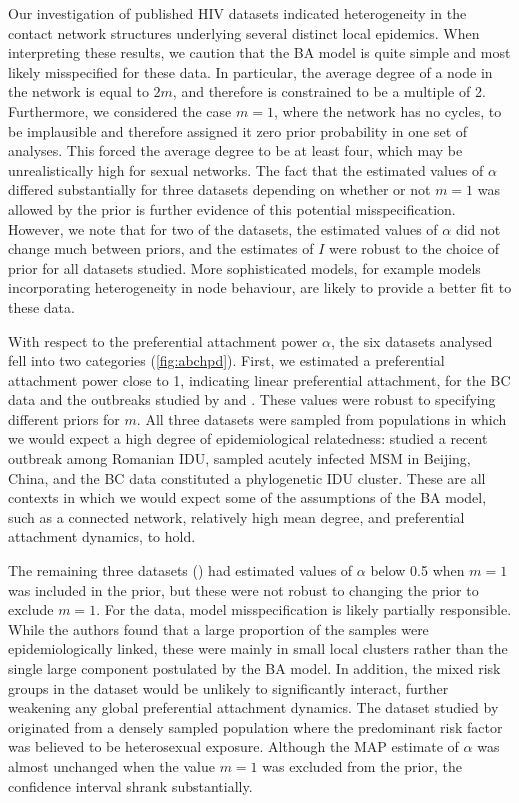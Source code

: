 Our investigation of published HIV datasets indicated heterogeneity in the
contact network structures underlying several distinct local epidemics. When
interpreting these results, we caution that the BA model is quite simple and
most likely misspecified for these data. In particular, the average degree of a
node in the network is equal to $2m$, and therefore is constrained to be a
multiple of 2. Furthermore, we considered the case $m = 1$, where the network
has no cycles, to be implausible and therefore assigned it zero prior
probability in one set of analyses. This forced the average degree to be at
least four, which may be unrealistically high for sexual networks. The fact
that the estimated values of $\alpha$ differed substantially for three datasets
depending on whether or not $m = 1$ was allowed by the prior is further evidence
of this potential misspecification. However, we note that for two of the
datasets, the estimated values of $\alpha$ did not change much between priors,
and the estimates of $I$ were robust to the choice of prior for all datasets
studied. More sophisticated models, for example models incorporating
heterogeneity in node behaviour, are likely to provide a better fit to these
data.

With respect to the preferential attachment power $\alpha$, the six datasets
analysed fell into two categories (\cref{fig:abchpd}). First, we estimated a
preferential attachment power close to 1, indicating linear preferential
attachment, for the BC data and the outbreaks studied by
\textcite{niculescu2015recent} and \textcite{wang2015targeting}. These values
were robust to specifying different priors for $m$. All three datasets were
sampled from populations in which we would expect a high degree of
epidemiological relatedness: \textcite{niculescu2015recent} studied a recent
outbreak among Romanian \gls{IDU}, \citeauthor{wang2015targeting} sampled
acutely infected MSM in Beijing, China, and the BC data constituted a
phylogenetic \gls{IDU} cluster. These are all contexts in which we would expect
some of the assumptions of the BA model, such as a connected network,
relatively high mean degree, and preferential attachment dynamics, to hold.

The remaining three datasets (\textcite{cuevas2009hiv, novitsky2014impact,
li2015hiv}) had estimated values of $\alpha$ below 0.5 when $m = 1$ was
included in the prior, but these were not robust to changing the prior to
exclude $m = 1$. For the \citeauthor{cuevas2009hiv} data, model
misspecification is likely partially responsible. While the authors found that
a large proportion of the samples were epidemiologically linked, these were
mainly in small local clusters rather than the single large component
postulated by the BA model. In addition, the mixed risk groups in the dataset
would be unlikely to significantly interact, further weakening any global
preferential attachment dynamics. The dataset studied by
\textcite{novitsky2014impact} originated from a densely sampled population
where the predominant risk factor was believed to be heterosexual exposure.
Although the MAP estimate of $\alpha$ was almost unchanged when the value $m =
1$ was excluded from the prior, the confidence interval shrank substantially.

